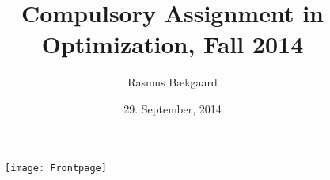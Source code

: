 \documentclass[oneside, 10pt]{article}
\title{Compulsory Assignment in Optimization, Fall 2014}
\author{Rasmus Bækgaard}
\date{29. September, 2014}
\begin{document}
\maketitle

\begin{figure}[hbtp]
\centering
\texttt{[image: Frontpage]}
\vspace{-15pt}
\end{figure}

\newpage


\newpage

\newpage

\newpage

\newpage

\newpage

\end{document}

